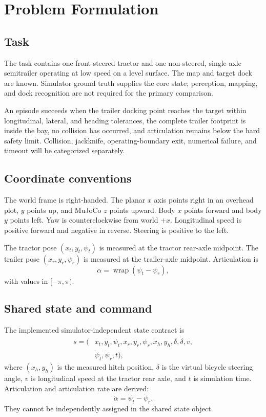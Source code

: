 \section{Problem Formulation}

\subsection{Task}

The task contains one front-steered tractor and one non-steered, single-axle
semitrailer operating at low speed on a level surface. The map and target dock
are known. Simulator ground truth supplies the core state; perception, mapping,
and dock recognition are not required for the primary comparison.

An episode succeeds when the trailer docking point reaches the target within
longitudinal, lateral, and heading tolerances, the complete trailer footprint
is inside the bay, no collision has occurred, and articulation remains below
the hard safety limit. Collision, jackknife, operating-boundary exit, numerical
failure, and timeout will be categorized separately.

\subsection{Coordinate conventions}

The world frame is right-handed. The planar $x$ axis points right in an
overhead plot, $y$ points up, and MuJoCo $z$ points upward. Body $x$ points
forward and body $y$ points left. Yaw is counterclockwise from world $+x$.
Longitudinal speed is positive forward and negative in reverse. Steering is
positive to the left.

The tractor pose $(x_t,y_t,\psi_t)$ is measured at the tractor rear-axle
midpoint. The trailer pose $(x_r,y_r,\psi_r)$ is measured at the trailer-axle
midpoint. Articulation is
\begin{equation}
  \alpha = \operatorname{wrap}(\psi_t-\psi_r),
\end{equation}
with values in $[-\pi,\pi)$.

\subsection{Shared state and command}

The implemented simulator-independent state contract is
\begin{align}
  s = (&x_t,y_t,\psi_t,x_r,y_r,\psi_r,x_h,y_h,\delta,\dot{\delta},v,\\
       &\dot{\psi}_t,\dot{\psi}_r,t),
\end{align}
where $(x_h,y_h)$ is the measured hitch position, $\delta$ is the virtual
bicycle steering angle, $v$ is longitudinal speed at the tractor rear axle,
and $t$ is simulation time. Articulation and articulation rate are derived:
\begin{equation}
  \dot{\alpha}=\dot{\psi}_t-\dot{\psi}_r.
\end{equation}
They cannot be independently assigned in the shared state object.

